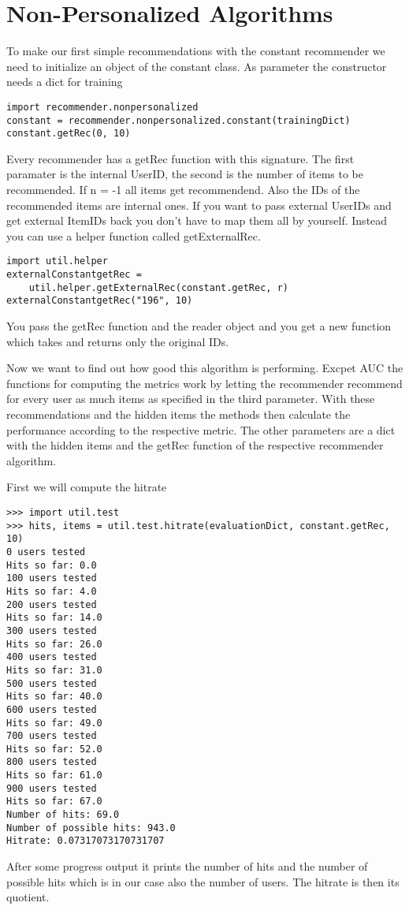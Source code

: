 \section{Non-Personalized Algorithms}
To make our first simple recommendations with the constant recommender
we need to initialize an object of the constant class.
As parameter the constructor needs a dict for training
\begin{lstlisting}
import recommender.nonpersonalized
constant = recommender.nonpersonalized.constant(trainingDict)
constant.getRec(0, 10)
\end{lstlisting}
Every recommender has a getRec function with this signature. The first paramater is the internal
UserID, the second is the number of items to be recommended. If n = -1 all items get recommendend.
Also the IDs of the recommended items are internal ones.
If you want to pass external UserIDs and get external ItemIDs back you don't have
to map them all by yourself. Instead you can use a helper function called
getExternalRec.
\begin{lstlisting}
import util.helper
externalConstantgetRec = 
    util.helper.getExternalRec(constant.getRec, r)
externalConstantgetRec("196", 10)
\end{lstlisting}
You pass the getRec function and the reader object and you get a new function
which takes and returns only the original IDs.

Now we want to find out how good this algorithm is performing.
Excpet AUC the functions for computing the metrics work by letting the recommender recommend
for every user as much items as specified in the third parameter.
With these recommendations and the hidden items the methods then calculate the
performance according to the respective metric.
The other parameters are a dict with the hidden items and the getRec function of the 
respective recommender algorithm.

First we will compute the hitrate
\begin{lstlisting}
>>> import util.test
>>> hits, items = util.test.hitrate(evaluationDict, constant.getRec, 10)
0 users tested
Hits so far: 0.0
100 users tested
Hits so far: 4.0
200 users tested
Hits so far: 14.0
300 users tested
Hits so far: 26.0
400 users tested
Hits so far: 31.0
500 users tested
Hits so far: 40.0
600 users tested
Hits so far: 49.0
700 users tested
Hits so far: 52.0
800 users tested
Hits so far: 61.0
900 users tested
Hits so far: 67.0
Number of hits: 69.0
Number of possible hits: 943.0
Hitrate: 0.07317073170731707
\end{lstlisting}
After some progress output it prints the number of hits and the number of 
possible hits which is in our case also the number of users. The hitrate
is then its quotient.


